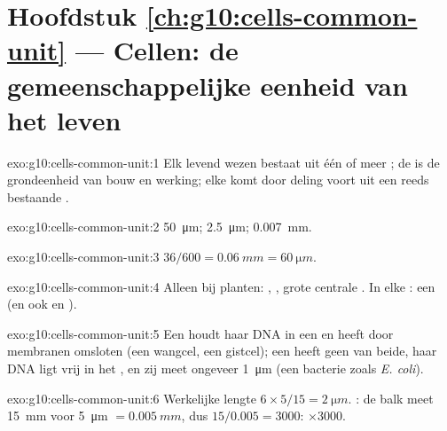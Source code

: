 \section*{Hoofdstuk \ref{ch:g10:cells-common-unit} --- Cellen: de gemeenschappelijke eenheid van het leven}

\begin{solution}{exo:g10:cells-common-unit:1}
Elk levend wezen bestaat uit één of meer ; de  is de
grondeenheid van bouw en werking; elke  komt door deling voort uit
een reeds bestaande .
\end{solution}

\begin{solution}{exo:g10:cells-common-unit:2}
\qty{50}{\micro m}; \qty{2.5}{\micro m}; \qty{0.007}{mm}.
\end{solution}

\begin{solution}{exo:g10:cells-common-unit:3}
$36/600 = \qty{0.06}{mm} = \qty{60}{\micro m}$.
\end{solution}

\begin{solution}{exo:g10:cells-common-unit:4}
Alleen bij planten: , , grote centrale .
In elke : een  (en ook  en ).
\end{solution}

\begin{solution}{exo:g10:cells-common-unit:5}
Een  houdt haar DNA in een  en heeft door membranen
omsloten  (een wangcel, een gistcel); een  heeft
geen van beide, haar DNA ligt vrij in het , en zij meet
ongeveer \qty{1}{\micro m} (een bacterie zoals \emph{E. coli}).
\end{solution}

\begin{solution}{exo:g10:cells-common-unit:6}
Werkelijke lengte $6 \times 5/15 = \qty{2}{\micro m}$. : de
balk meet \qty{15}{mm} voor \qty{5}{\micro m} $= \qty{0.005}{mm}$, dus
$15/0.005 = 3000$: $\times 3000$.
\end{solution}

